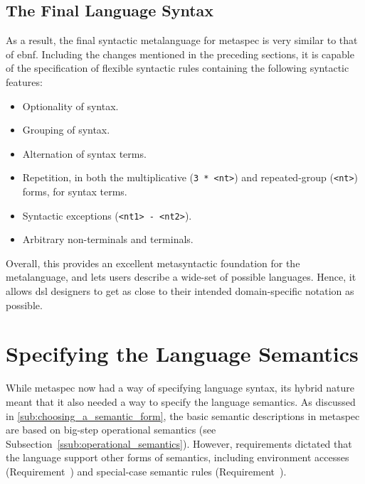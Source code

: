 
\subsection{The Final Language Syntax} %
\label{sub:the_final_language_syntax}
As a result, the final syntactic metalanguage for \gls{metaspec} is very similar to that of \gls{ebnf}.
Including the changes mentioned in the preceding sections, it is capable of the specification of flexible syntactic rules containing the following syntactic features:
\begin{itemize}
    \item Optionality of syntax.
    \item Grouping of syntax.
    \item Alternation of syntax terms.
    \item Repetition, in both the multiplicative (\texttt{3 * <nt>}) and repeated-group (\texttt{{<nt>}}) forms, for syntax terms.
    \item Syntactic exceptions (\texttt{<nt1> - <nt2>}).
    \item Arbitrary non-terminals and terminals.
\end{itemize}

Overall, this provides an excellent metasyntactic foundation for the metalanguage, and lets users describe a wide-set of possible languages.
Hence, it allows \gls{dsl} designers to get as close to their intended domain-specific notation as possible. 



\section{Specifying the Language Semantics} %
\label{sec:specifying_the_language_semantics}

While \gls{metaspec} now had a way of specifying language syntax, its hybrid nature meant that it also needed a way to specify the language semantics. 
As discussed in \autoref{sub:choosing_a_semantic_form}, the basic semantic descriptions in metaspec are based on big-step operational semantics (see Subsection~\ref{ssub:operational_semantics}). 
However, requirements dictated that the language support other forms of semantics, including environment accesses (Requirement~) and special-case semantic rules (Requirement~).\\

